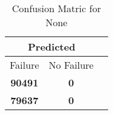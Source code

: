 \begin{table}[] 
\label{Table: Prediction Accuracy-DMDNoneNoneEKF-top2Reflection-Reflection} 
\caption{Confusion Matric for None} 
\centering 
\begin{tabular} 
 {@{}ccc@{}} 
\toprule 
\multicolumn{2}{c}{\textbf{Predicted}}
 \\ \midrule 
\multicolumn{1}{|c|}{Failure} & 
\multicolumn{1}{c|}{No Failure}
 \\ \midrule 
\multicolumn{1}{|c|}{\color{green}\textbf{90491}} & 
\multicolumn{1}{c|}{\color{green}\textbf{0}}
 \\ \midrule 
\multicolumn{1}{|c|}{\color{red}\textbf{79637}} & 
\multicolumn{1}{c|}{\color{green}\textbf{0}}
 \\ \bottomrule 
\end{tabular} 
\end{table} 
